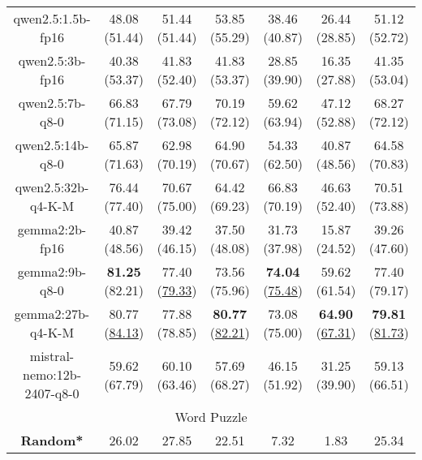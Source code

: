 \begin{table}[hbp]
{\begin{tabular}{ccccccc}
      \multicolumn{1}{c|}{qwen2.5:1.5b-fp16} & 48.08 (51.44) & 51.44 (51.44) & \multicolumn{1}{c|}{53.85 (55.29)} & 38.46 (40.87) & \multicolumn{1}{c|}{26.44 (28.85)} & 51.12 (52.72) \\


      \multicolumn{1}{c|}{qwen2.5:3b-fp16} & 40.38 (53.37) & 41.83 (52.40) & \multicolumn{1}{c|}{41.83 (53.37)} & 28.85 (39.90) & \multicolumn{1}{c|}{16.35 (27.88)} & 41.35 (53.04) \\


      \multicolumn{1}{c|}{qwen2.5:7b-q8-0} & 66.83 (71.15) & 67.79 (73.08) & \multicolumn{1}{c|}{70.19 (72.12)} & 59.62 (63.94) & \multicolumn{1}{c|}{47.12 (52.88)} & 68.27 (72.12) \\


      \multicolumn{1}{c|}{qwen2.5:14b-q8-0} & 65.87 (71.63) & 62.98 (70.19) & \multicolumn{1}{c|}{64.90 (70.67)} & 54.33 (62.50) & \multicolumn{1}{c|}{40.87 (48.56)} & 64.58 (70.83) \\


      \multicolumn{1}{c|}{qwen2.5:32b-q4-K-M} & 76.44 (77.40) & 70.67 (75.00) & \multicolumn{1}{c|}{64.42 (69.23)} & 66.83 (70.19) & \multicolumn{1}{c|}{46.63 (52.40)} & 70.51 (73.88) \\


      \multicolumn{1}{c|}{gemma2:2b-fp16} & 40.87 (48.56) & 39.42 (46.15) & \multicolumn{1}{c|}{37.50 (48.08)} & 31.73 (37.98) & \multicolumn{1}{c|}{15.87 (24.52)} & 39.26 (47.60) \\


      \multicolumn{1}{c|}{gemma2:9b-q8-0} & \textbf{81.25} (82.21) & 77.40 (\underline{79.33}) & \multicolumn{1}{c|}{73.56 (75.96)} & \textbf{74.04} (\underline{75.48}) & \multicolumn{1}{c|}{59.62 (61.54)} & 77.40 (79.17) \\


      \multicolumn{1}{c|}{gemma2:27b-q4-K-M} & 80.77 (\underline{84.13}) & 77.88 (78.85) & \multicolumn{1}{c|}{\textbf{80.77} (\underline{82.21})} & 73.08 (75.00) & \multicolumn{1}{c|}{\textbf{64.90} (\underline{67.31})} & \textbf{79.81} (\underline{81.73}) \\


      \multicolumn{1}{c|}{mistral-nemo:12b-2407-q8-0} & 59.62 (67.79) & 60.10 (63.46) & \multicolumn{1}{c|}{57.69 (68.27)} & 46.15 (51.92) & \multicolumn{1}{c|}{31.25 (39.90)} & 59.13 (66.51) \\

      \hline
      \multicolumn{7}{c}{Word Puzzle} \\ \hline
      \multicolumn{1}{c|}{\textbf{Random*}} & 26.02 & 27.85 & \multicolumn{1}{c|}{22.51} & 7.32 & \multicolumn{1}{c|}{1.83} & 25.34 \\ \hline


\end{tabular}}
\end{table}
